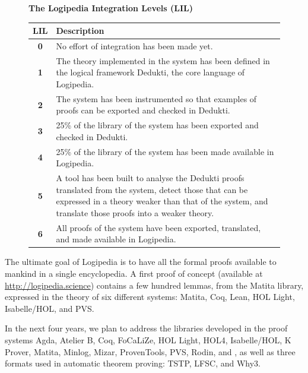 \begin{figure}[ht]
\begin{shaded}
\begin{center}
{\bf \Large The Logipedia Integration Levels (LIL)\label{lil}}
\end{center}

\begin{longtable*}{|c|p{0.9\textwidth}|}
\hline
{\bf LIL} & {\bf Description}\\
\hline
{\bf 0} & No effort of integration has been made yet.\\
\hline
{\bf 1} & The theory implemented in the system has been defined in
the logical framework Dedukti, the core language of Logipedia.\\
\hline
{\bf 2} & The system has been instrumented so that examples of proofs
can be exported and checked in Dedukti.\\
\hline
{\bf 3} & 25\% of the library of the system has been
exported and checked in Dedukti.\\
\hline
{\bf 4} & 25\% of the library of the system has
been made available in Logipedia.\\
\hline
{\bf 5} & A tool has been built to analyse the Dedukti proofs
translated from the system, detect those that can be expressed in a theory
weaker than that of the system, and translate those proofs into a
weaker theory.\\
\hline
{\bf 6} & All proofs of the system have been exported, translated,
and made available in Logipedia.\\
\hline
\end{longtable*}
\end{shaded}
\end{figure}

The ultimate goal of Logipedia is to have all the formal proofs
available to mankind in a single encyclopedia.  A first proof of
concept (available at \url{http://logipedia.science}) contains a few hundred
lemmas, from the Matita library, expressed in the theory of six
different systems: Matita, Coq, Lean, HOL Light, Isabelle/HOL, and
PVS.

In the next four years, we plan to address
the libraries developed in the proof systems Agda, Atelier B, Coq, FoCaLiZe, HOL Light, HOL4,
Isabelle/HOL, K Prover, Matita, Minlog, Mizar, ProvenTools, PVS,
Rodin, and \tlaplus, as well as three formats used in automatic
theorem proving: TSTP, LFSC, and Why3. 


